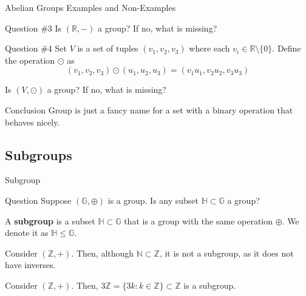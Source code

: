 \documentclass{zkdl-presentation-template}
\begin{document}
    \begin{frame}{Abelian Groups Examples and Non-Examples}
      \begin{questionblock}{Question \#3}
        Is $(\mathbb{R}, -)$ a group? If no, what is missing? \pause
      \end{questionblock}
      \begin{questionblock}{Question \#4}
          Set $V$ is a set of tuples $(v_1,v_2,v_3)$ where each $v_i \in \mathbb{R} \setminus \{0\}$. Define the operation $\odot$ as
          \begin{equation*}
              (v_1,v_2,v_3) \odot (u_1,u_2,u_3) = (v_1u_1, v_2u_2, v_3u_3)
          \end{equation*}

          Is $(V, \odot)$ a group? If no, what is missing?\pause
      \end{questionblock}
      \begin{remarkblock}{Conclusion}
        Group is just a fancy name for a set with a binary operation that behaves nicely.
      \end{remarkblock}
    \end{frame}

    \subsection{Subgroups}
    \begin{frame}{Subgroup}

      \begin{questionblock}{Question}
          Suppose $(\mathbb{G}, \oplus)$ is a group. Is any subset $\mathbb{H} \subset \mathbb{G}$ a group?\pause
      \end{questionblock}

      \begin{definition}
          A \textbf{subgroup} is a subset $\mathbb{H} \subset \mathbb{G}$ that is a group with the same operation $\oplus$. We denote it as $\mathbb{H} \leq \mathbb{G}$.\pause
      \end{definition}

      \begin{example}
          Consider $(\mathbb{Z}, +)$. Then, although $\mathbb{N} \subset \mathbb{Z}$, it is not a subgroup, as it does not have inverses.\pause
      \end{example}

      \begin{example}
          Consider $(\mathbb{Z}, +)$. Then, $3\mathbb{Z} = \{3k: k \in \mathbb{Z}\} \subset \mathbb{Z}$ is a subgroup.
      \end{example}
  \end{frame}
\end{document}

